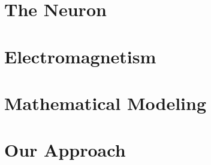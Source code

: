 \documentclass[../Orator.tex]{subfiles}
\begin{document}
\chapter{The Neuron}


\chapter{Electromagnetism}


\chapter{Mathematical Modeling}


\chapter{Our Approach}

\end{document}
